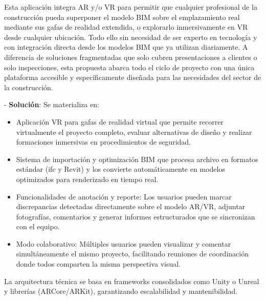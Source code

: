 Esta aplicación integra AR y/o VR para permitir que cualquier profesional de la construcción pueda superponer el modelo BIM sobre el emplazamiento real mediante sus gafas de realidad extendida, o explorarlo inmersivamente en VR desde cualquier ubicación. Todo ello sin necesidad de ser experto en tecnología y con integración directa desde los modelos BIM que ya utilizan diariamente. A diferencia de soluciones fragmentadas que solo cubren presentaciones a clientes o solo inspecciones, esta propuesta abarca todo el ciclo de proyecto con una única plataforma accesible y específicamente diseñada para las necesidades del sector de la construcción.

- \textbf{Solución}: Se materializa en:
\begin{itemize}
\item Aplicación VR para gafas de realidad virtual que permite recorrer virtualmente el proyecto completo, evaluar alternativas de diseño y realizar formaciones inmersivas en procedimientos de seguridad.
\item Sistema de importación y optimización BIM que procesa archivo en formatos estándar (\gls{ifc} y Revit) y los convierte automáticamente en modelos optimizados para renderizado en tiempo real.
\item Funcionalidades de anotación y reporte: Los usuarios pueden marcar discrepancias detectadas directamente sobre el modelo AR/VR, adjuntar fotografías, comentarios y generar informes estructurados que se sincronizan con el equipo.
\item Modo colaborativo: Múltiples usuarios pueden visualizar y comentar simultáneamente el mismo proyecto, facilitando reuniones de coordinación donde  todos comparten la misma perspectiva visual.
\end{itemize}
La arquitectura técnica se basa en frameworks consolidados como Unity o Unreal y librerías (ARCore/ARKit), garantizando escalabilidad y mantenibilidad.

